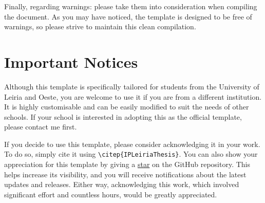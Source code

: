 Finally, regarding warnings: please take them into consideration when compiling the document. As you may have noticed, the template is designed to be free of warnings, so please strive to maintain this clean compilation.

\section{Important Notices}
Although this template is specifically tailored for students from the University of Leiria and Oeste, you are welcome to use it if you are from a different institution. It is highly customisable and can be easily modified to suit the needs of other schools. If your school is interested in adopting this as the official template, please contact me first. 

If you decide to use this template, please consider acknowledging it in your work. To do so, simply cite it using \verb|\citep{IPLeiriaThesis}|. You can also show your appreciation for this template by giving a \href{https://github.com/joseareia/ipleiria-thesis/stargazers}{star} on the GitHub repository. This helps increase its visibility, and you will receive notifications about the latest updates and releases. Either way, acknowledging this work, which involved significant effort and countless hours, would be greatly appreciated.
